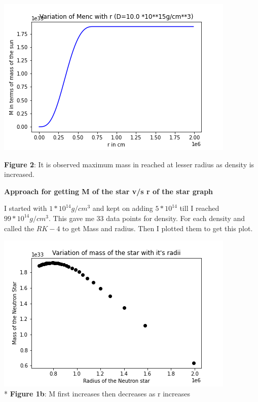 \documentclass{article}
\begin{document}
\begin{center}
\begin{multicols}{2}
\begin{center}
        \end{center}
\columnbreak
	\begin{center}
       \includegraphics[scale=0.4]{Images/Mr_pb2_4}
       \end{center}
\end{multicols}
\textbf{Figure 2}: It is observed maximum mass in reached at lesser radius as density is increased.
\end{center}
\vspace{0.2em}

 \clearpage
\textbf{Approach for getting M of the star v/s r of the star graph}

I started with $1*10^{14}g/cm^{3}$ and kept on adding $5*10^{14}$ till I reached $99*10^{14}g/cm^{3}$. This gave me 33 data points for density. For each density and called the $RK-4$ to get Mass and radius. Then I plotted them to get this plot.

\begin{center}
\includegraphics[scale=0.5]{Images/Mr_pb2h}
\\*
\textbf{Figure 1b}: M first increases then decreases as r increases
\end{center}
\end{document}
